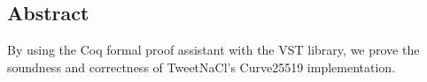\subsection*{Abstract}

By using the Coq formal proof assistant with the VST library, we prove the
soundness and correctness of TweetNaCl's Curve25519 implementation.
